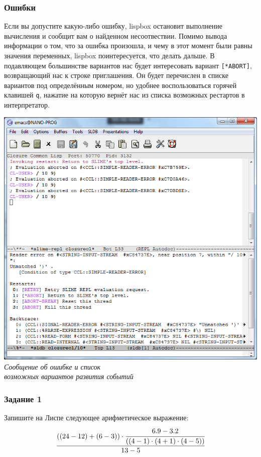 \documentclass[a4paper, 12pt, titlepage, twoside]{article}
\begin{document}
\subsubsection{Ошибки}
Если вы допустите какую-либо ошибку, lispbox остановит выполнение вычисления и сообщит вам о найденном несоотвествии. Помимо вывода информации о том, что за ошибка произошла, и чему в этот момент были равны значения переменных, lispbox поинтересуется, что делать дальше. В подавляющем большинстве вариантов нас будет интересовать вариант \verb|[*ABORT]|, возвращающий нас к строке приглашения. Он будет перечислен в списке вариантов под определённым номером, но удобнее воспользоваться горячей клавишей \verb|q|, нажатие на которую вернёт нас из списка возможных рестартов в интерпретатор.
\begin{center}
  \includegraphics[scale=.7]{lispbox_error_conditions}\\
  \small{\textit{Сообщение об ошибке и список\\возможных вариантов развития событий}}
\end{center}
\subsubsection{Задание 1}
Запишите на Лиспе следующее арифметическое выражение:\\
\[
\cfrac{((24 - 12) + (6 - 3))\cdot\cfrac{6.9 - 3.2}{((4 - 1)\cdot(4 + 1)\cdot(4 - 5))}}{13 - 5}
\]
\newpage
\end{document}
